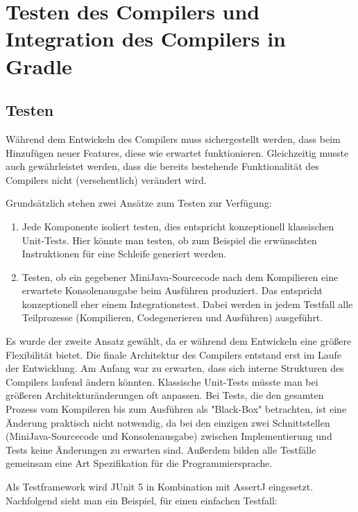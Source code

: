 \chapter{Testen des Compilers und Integration des Compilers in Gradle}

\section{Testen}

Während dem Entwickeln des Compilers muss sichergestellt werden, dass beim Hinzufügen neuer Features, diese wie erwartet funktionieren. Gleichzeitig musste auch gewährleistet werden, dass die bereits bestehende Funktionalität des Compilers nicht (versehentlich) verändert wird.

Grundsätzlich stehen zwei Ansätze zum Testen zur Verfügung:
\begin{enumerate}
    \item Jede Komponente isoliert testen, dies entspricht konzeptionell klassischen Unit-Tests. Hier könnte man testen, ob zum Beispiel die erwünschten Instruktionen für eine Schleife generiert werden. 
    \item Testen, ob ein gegebener MiniJava-Sourcecode nach dem Kompilieren eine erwartete Konsolenausgabe beim Ausführen produziert. Das entspricht konzeptionell eher einem Integrationstest. Dabei werden in jedem Testfall alle Teilprozesse (Kompilieren, Codegenerieren und Ausführen) ausgeführt.
\end{enumerate}

Es wurde der zweite Ansatz gewählt, da er während dem Entwickeln eine größere Flexibilität bietet. Die finale Architektur des Compilers entstand erst im Laufe der Entwicklung. Am Anfang war zu erwarten, dass sich interne Strukturen des Compilers laufend ändern könnten. Klassische Unit-Tests müsste man bei größeren Architekturänderungen oft anpassen. Bei Tests, die den gesamten Prozess vom Kompileren bis zum Ausführen als "Black-Box" betrachten, ist eine Änderung praktisch nicht notwendig, da bei den einzigen zwei Schnittstellen (MiniJava-Sourcecode und Konsolenausgabe) zwischen Implementierung und Tests keine Änderungen zu erwarten sind. Außerdem bilden alle Testfälle gemeinsam eine Art Spezifikation für die Programmiersprache.

Als Testframework wird JUnit 5 \cite{JUnit} in Kombination mit AssertJ \cite{AssertJ} eingesetzt. Nachfolgend sieht man ein Beispiel, für einen einfachen Testfall:



